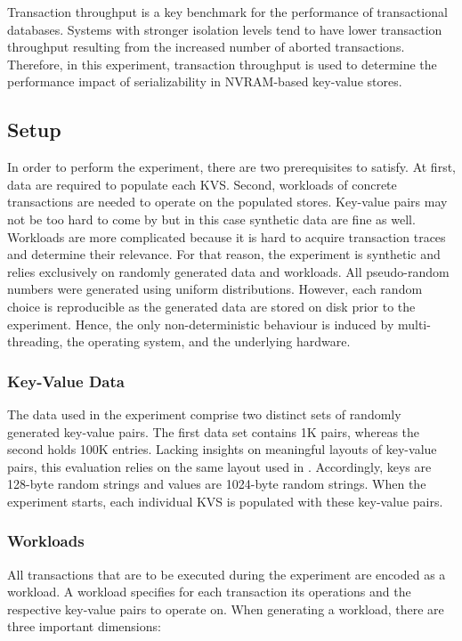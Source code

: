 Transaction throughput is a key benchmark for the performance of transactional
databases. Systems with stronger isolation levels tend to have lower transaction
throughput resulting from the increased number of aborted transactions.
Therefore, in this experiment, transaction throughput is used to determine the
performance impact of serializability in NVRAM-based key-value stores.

\subsection{Setup}

In order to perform the experiment, there are two prerequisites to satisfy. At
first, data are required to populate each KVS. Second, workloads of concrete
transactions are needed to operate on the populated stores. Key-value pairs may
not be too hard to come by but in this case synthetic data are fine as well.
Workloads are more complicated because it is hard to acquire transaction traces
and determine their relevance. For that reason, the experiment is synthetic and
relies exclusively on randomly generated data and workloads. All pseudo-random
numbers were generated using uniform distributions. However, each random choice
is reproducible as the generated data are stored on disk prior to the
experiment. Hence, the only non-deterministic behaviour is induced by
multi-threading, the operating system, and the underlying hardware.

\subsubsection{Key-Value Data}

The data used in the experiment comprise two distinct sets of randomly generated
key-value pairs. The first data set contains 1K pairs, whereas the second holds
100K entries. Lacking insights on meaningful layouts of key-value pairs, this
evaluation relies on the same layout used in \cite{bailey2013exploring}.
Accordingly, keys are 128-byte random strings and values are 1024-byte random
strings. When the experiment starts, each individual KVS is populated with these
key-value pairs.

\subsubsection{Workloads}

All transactions that are to be executed during the experiment are encoded as a
workload. A workload specifies for each transaction its operations and the
respective key-value pairs to operate on. When generating a workload, there are
three important dimensions:

